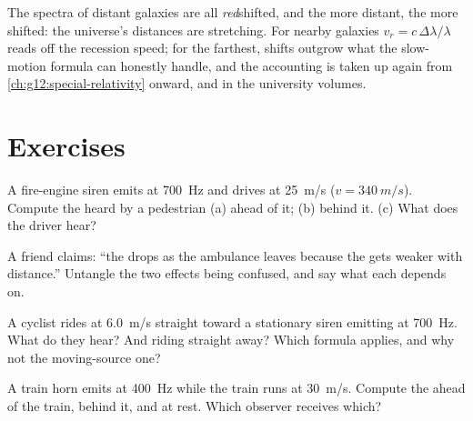 \begin{remark}\label{rem:g12:doppler-effect:expansion}
The spectra of distant galaxies are all \emph{red}shifted, and the more distant, the more
shifted: the universe's distances are stretching. For nearby galaxies
$v_r = c\,\Delta\lambda/\lambda$ reads off the recession speed; for the farthest, shifts
outgrow what the slow-motion formula can honestly handle, and the accounting is taken up
again from \cref{ch:g12:special-relativity} onward, and in the university volumes.
\end{remark}

\section{Exercises}

\begin{exercise}[$\star$]\label{exo:g12:doppler-effect:1}
A fire-engine siren emits at \qty{700}{Hz} and drives at \qty{25}{m/s} ($v = \qty{340}{m/s}$).
Compute the  heard by a pedestrian (a) ahead of it; (b) behind it. (c) What does
the driver hear?
\end{exercise}

\begin{exercise}[$\star$]\label{exo:g12:doppler-effect:2}
A friend claims: ``the  drops as the ambulance leaves because the  gets weaker
with distance.'' Untangle the two effects being confused, and say what each depends on.
\end{exercise}

\begin{exercise}[$\star$]\label{exo:g12:doppler-effect:3}
A cyclist rides at \qty{6.0}{m/s} straight toward a stationary siren emitting at \qty{700}{Hz}.
What  do they hear? And riding straight away? Which formula applies, and why not
the moving-source one?
\end{exercise}

\begin{exercise}[$\star$]\label{exo:g12:doppler-effect:4}
A train horn emits at \qty{400}{Hz} while the train runs at \qty{30}{m/s}. Compute the
 ahead of the train, behind it, and at rest. Which observer receives which?
\end{exercise}

